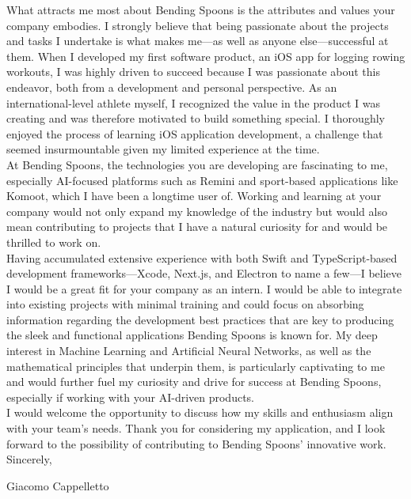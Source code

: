 \documentclass[letterpaper,11pt]{article}
\begin{document}
What attracts me most about Bending Spoons is the attributes and values your company embodies. I strongly believe that being passionate about the projects and tasks I undertake is what makes me—as well as anyone else—successful at them. When I developed my first software product, an iOS app for logging rowing workouts, I was highly driven to succeed because I was passionate about this endeavor, both from a development and personal perspective. As an international-level athlete myself, I recognized the value in the product I was creating and was therefore motivated to build something special. I thoroughly enjoyed the process of learning iOS application development, a challenge that seemed insurmountable given my limited experience at the time.\\
\vspace{0.1in}
At Bending Spoons, the technologies you are developing are fascinating to me, especially AI-focused platforms such as Remini and sport-based applications like Komoot, which I have been a longtime user of. Working and learning at your company would not only expand my knowledge of the industry but would also mean contributing to projects that I have a natural curiosity for and would be thrilled to work on.\\
\vspace{0.1in}
Having accumulated extensive experience with both Swift and TypeScript-based development frameworks—Xcode, Next.js, and Electron to name a few—I believe I would be a great fit for your company as an intern. I would be able to integrate into existing projects with minimal training and could focus on absorbing information regarding the development best practices that are key to producing the sleek and functional applications Bending Spoons is known for. My deep interest in Machine Learning and Artificial Neural Networks, as well as the mathematical principles that underpin them, is particularly captivating to me and would further fuel my curiosity and drive for success at Bending Spoons, especially if working with your AI-driven products.\\
\vspace{0.1in}
I would welcome the opportunity to discuss how my skills and enthusiasm align with your team's needs. Thank you for considering my application, and I look forward to the possibility of contributing to Bending Spoons' innovative work.\\
\vspace{0.2in}
Sincerely,
\vspace{0.1in}

Giacomo Cappelletto
\end{document}
